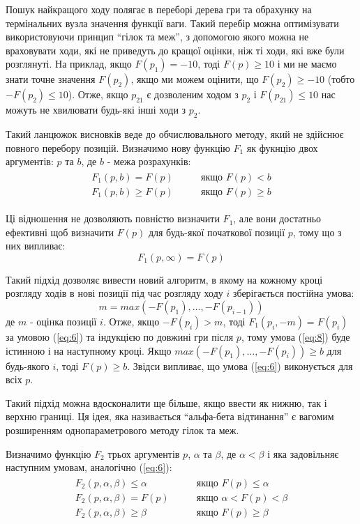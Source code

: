\documentclass[12pt,a4paper]{article}
\begin{document}
Пошук найкращого ходу полягає в переборі дерева гри та обрахунку на
термінальних вузла значення функції ваги. Такий перебір можна оптимізувати
використовуючи принцип ``гілок та меж'', з допомогою якого можна не
враховувати ходи, які не приведуть до кращої оцінки, ніж ті ходи, які вже були
розглянуті. На приклад, якщо $F(p_1)=-10$, тоді $F(p)\ge10$ і ми не маємо
знати точне значення $F(p_2)$, якщо ми можем оцінити, що $F(p_2)\ge-10$ (тобто
$-F(p_2)\le10$). Отже, якщо $p_{21}$ є дозволеним ходом з $p_2$ і
$F(p_{21})\le10$ нас можуть не хвилювати будь-які інші ходи з $p_2$.

Такий ланцюжок висновків веде до обчислювального методу, який не здійснює
повного перебору позицій. Визначимо нову функцію $F_1$ як фукнцію двох
аргументів: $p$ та $b$, де $b$ - межа розрахунків:
\begin{align}
  \label{eq:6}
  \begin{split}
    F_1(p, b) = F(p) &\qquad \textit{якщо $F(p) < b$}\\
    F_1(p, b)\ge F(p) &\qquad \textit{якщо $F(p) \ge b$}
  \end{split}
\end{align}

Ці відношення не дозволяють повністю визначити $F_1$, але вони достатньо
ефективні щоб визначити $F(p)$ для будь-якої початкової позиції $p$, тому що з
них випливає:
\begin{equation}
  \label{eq:7}
  F_1(p, \infty) = F(p)
\end{equation}

Такий підхід дозволяє вивести новий алгоритм, в якому на кожному кроці
розгляду ходів в нові позиції під час розгляду ходу $i$ зберігається постійна
умова:
\begin{equation}
  \label{eq:8}
  m = max(-F(p_1),\dots,-F(p_{i-1}))
\end{equation}
де $m$ - оцінка позиції $i$. Отже, якщо $-F(p_i) > m$, тоді $F_1(p_i, -m) =
F(p_i)$ за умовою (\ref{eq:6}) та індукцією по довжині гри після $p$, тому
умова (\ref{eq:8}) буде істинною і на наступному кроці. Якщо
$max(-F(p_1),\dots,-F(p_{i})) \ge b$ для будь-якого $i$, тоді $F(p) \ge
b$. Звідси випливає, що умова (\ref{eq:6}) виконується для всіх $p$.

Такий підхід можна вдосконалити ще більше, якщо ввести як нижню, так і верхню
границі. Ця ідея, яка називається ``альфа-бета відтинання'' є вагомим
розширенням однопараметрового методу гілок та меж.

Визначимо функцію $F_2$ трьох аргументів $p$, $\alpha$ та $\beta$, де $\alpha
< \beta$ і яка задовільняє наступним умовам, аналогічно (\ref{eq:6}):
\begin{align}
  \label{eq:9}
  \begin{split}
    F_2(p, \alpha, \beta) \le \alpha &\qquad \textit{якщо $F(p) \le \alpha$}\\
    F_2(p, \alpha, \beta) = F(p) &\qquad \textit{якщо $\alpha < F(p) < \beta$}\\
    F_2(p, \alpha, \beta) \ge \beta &\qquad \textit{якщо $F(p) \ge \beta$}
  \end{split}
\end{align}
\end{document}
